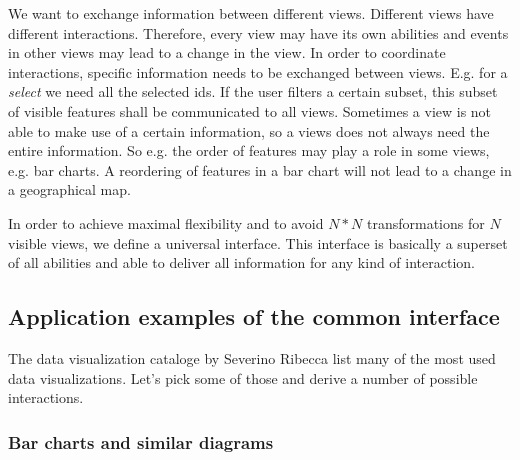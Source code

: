 \documentclass{article}
\begin{document}
We want to exchange information between different views.
Different views have different interactions.
Therefore, every view may have its own abilities and events in other views may lead to a change in the view.
In order to coordinate interactions, specific information needs to be exchanged between views.
E.g. for a \emph{select} we need all the selected ids.
If the user filters a certain subset, this subset of visible features shall be communicated to all views.
Sometimes a view is not able to make use of a certain information, so a views does not always need the entire information.
So e.g. the order of features may play a role in some views, e.g. bar charts.
A reordering of features in a bar chart will not lead to a change in a geographical map.

In order to achieve maximal flexibility and to avoid $N*N$ transformations for $N$ visible views, we define a universal interface.
This interface is basically a superset of all abilities and able to deliver all information for any kind of interaction.

\subsection{Application examples of the common interface}

The data visualization cataloge by Severino Ribecca list many of the most used data visualizations\cite{VisualizationCatalogue2017}.
Let's pick some of those and derive a number of possible interactions.



\subsubsection{Bar charts and similar diagrams}
\end{document}
